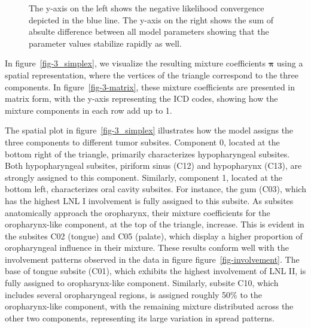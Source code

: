 \documentclass[
  sn-mathphys-num,
]{sn-jnl}
\begin{document}
\begin{figure}


\caption{\label{fig-convergence}The y-axis on the left shows the
negative likelihood convergence depicted in the blue line. The y-axis on
the right shows the sum of absulte difference between all model
parameters showing that the parameter values stabilize rapidly as well.}

\end{figure}%

In figure~\ref{fig-3_simplex}, we visualize the resulting mixture
coefficients \(\boldsymbol{\pi}\) using a spatial representation, where
the vertices of the triangle correspond to the three components. In
figure~\ref{fig-3-matrix}, these mixture coefficients are presented in
matrix form, with the y-axis representing the ICD codes, showing how the
mixture components in each row add up to 1.

The spatial plot in figure~\ref{fig-3_simplex} illustrates how the model
assigns the three components to different tumor subsites. Component 0,
located at the bottom right of the triangle, primarily characterizes
hypopharyngeal subsites. Both hypopharyngeal subsites, piriform sinus
(C12) and hypopharynx (C13), are strongly assigned to this component.
Similarly, component 1, located at the bottom left, characterizes oral
cavity subsites. For instance, the gum (C03), which has the highest LNL
I involvement is fully assigned to this subsite. As subsites
anatomically approach the oropharynx, their mixture coefficients for the
oropharynx-like component, at the top of the triangle, increase. This is
evident in the subsites C02 (tongue) and C05 (palate), which display a
higher proportion of oropharyngeal influence in their mixture. These
results conform well with the involvement patterns observed in the data
in figure figure~\ref{fig-involvement}. The base of tongue subsite
(C01), which exhibits the highest involvement of LNL II, is fully
assigned to oropharynx-like component. Similarly, subsite C10, which
includes several oropharyngeal regions, is assigned roughly 50\% to the
oropharynx-like component, with the remaining mixture distributed across
the other two components, representing its large variation in spread
patterns.
\end{document}
